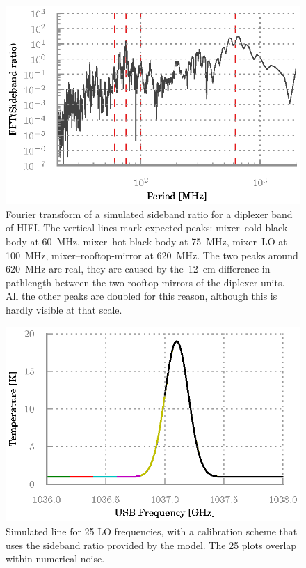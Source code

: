 \documentclass[journal]{IEEEtran}
\begin{document}
\begin{figure}
    \centering
    \includegraphics[width=\columnwidth]{sbr_fft}
    \caption{Fourier transform of a simulated sideband ratio for a diplexer band of HIFI.
    The vertical lines mark expected peaks: mixer--cold-black-body at \SI{60}{\mega\hertz}, mixer--hot-black-body at \SI{75}{\mega\hertz}, mixer--LO at \SI{100}{\mega\hertz}, mixer--rooftop-mirror at \SI{620}{\mega\hertz}.
    The two peaks around \SI{620}{\mega\hertz} are real, they are caused by the~\SI{12}{\centi\meter} difference in pathlength between the two rooftop mirrors of the diplexer units.  All the other peaks are doubled for this reason, although this is hardly visible at that scale.}
    \label{fig:sbr_fft}
\end{figure}

\begin{figure}
    \includegraphics[width=\columnwidth]{bb-on_corrected-3}
    \caption{Simulated line for 25 LO frequencies, with a calibration scheme that uses the sideband ratio provided by the model.  The 25 plots overlap within numerical noise.}
    \label{fig:calibrated_sbr}
\end{figure}
\end{document}
